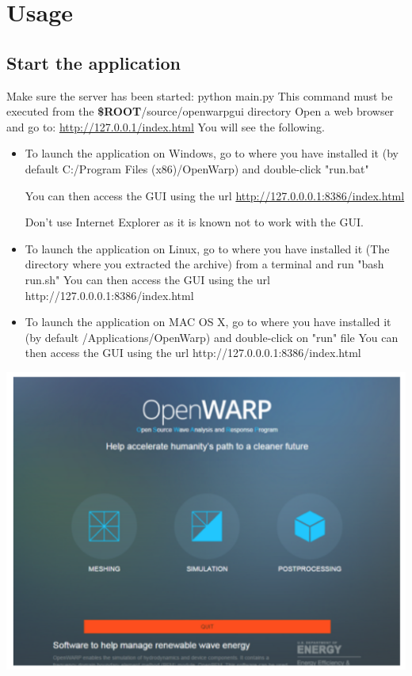 \documentclass[12pt]{article}
\newcommand{\ROOT}{{\textbf{\$ROOT}}}
\begin{document}
\section{Usage}
\label{usage}


\subsection{Start the application}
Make sure the server has been started:
{ \color{blue} python main.py}
This command must be executed from the \ROOT/source/openwarpgui directory
Open a web browser and go to:
\url{http://127.0.0.1/index.html}
You will see the following.

\begin{itemize}
	\item To launch the application on Windows, go to where you have installed it (by default C:/Program Files (x86)/OpenWarp) and double-click "run.bat"
	
	You can then access the GUI using the url \url{http://127.0.0.0.1:8386/index.html}
	
	Don't use Internet Explorer as it is known not to work with the GUI.
	
	
	\item To launch the application on Linux, go to where you have installed it (The directory where you extracted the archive) from a terminal and run "bash run.sh"
	You can then access the GUI using the url http://127.0.0.0.1:8386/index.html
	
	
	\item To launch the application on MAC OS X, go to where you have installed it (by default /Applications/OpenWarp) and double-click on "run" file
	You can then access the GUI using the url http://127.0.0.0.1:8386/index.html
\end{itemize}

	\vspace{\abovedisplayskip}
	\begin{minipage}{\linewidth}
		\centering
		\includegraphics[scale=0.4]{img/20}
	\end{minipage}
	\vspace{\belowdisplayskip}
	
\end{document}
